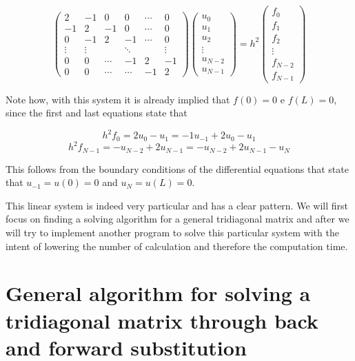 \documentclass {article}
\begin{document}
\begin{equation}
 \begin{pmatrix}
   2 & -1 &  0 & 0 & \cdots & 0  \\
  -1 &  2 & -1 & 0 & \cdots & 0  \\
   0 &-1 &  2 & -1 & \cdots & 0 \\
  \vdots  & \vdots  & & \ddots & & \vdots   \\
   0 &  0 & \cdots  & -1 & 2 & -1 \\
   0 &  0 & \cdots & \cdots  & -1 & 2
 \end{pmatrix}
 \begin{pmatrix}
  u_0 \\
  u_1 \\
  u_2 \\
  \vdots  \\
  u_{N-2} \\
  u_{N-1} 
 \end{pmatrix}
 = h^2
 \begin{pmatrix}
  f_0 \\
  f_1 \\
  f_2 \\
  \vdots  \\
  f_{N-2} \\
  f_{N-1} 
 \end{pmatrix}
\end{equation}

Note how, with this system it is already implied that $f(0)=0$ e $f(L)=0$, since the first and last equations state that

$$h^2 f_0 = 2 u_0-u_1 = -1 u_{-1}+2 u_0-u_1$$
$$h^2 f_{N-1} = -u_{N-2}+2 u_{N-1} =  -u_{N-2}+2 u_{N-1}-u_N$$ 

This follows from the boundary conditions of the differential equations that state that $u_{-1}=u(0)=0$ and $u_{N}=u(L)=0$.  

This linear system is indeed very particular and has a clear pattern. We will first focus on finding a solving algorithm for a general tridiagonal matrix and after we will try to implement another program to solve this particular system with the intent of lowering the number of calculation and therefore the computation time.

\section{General algorithm for solving a tridiagonal matrix through back and forward substitution}
\end{document}
